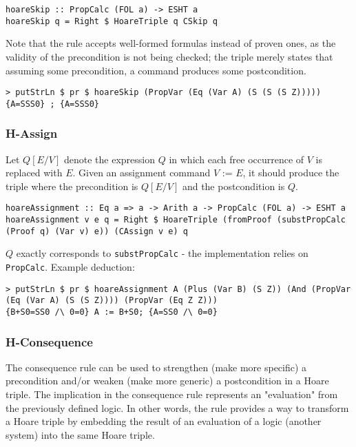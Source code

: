\documentclass{article}
\begin{document}
\begin{lstlisting}
hoareSkip :: PropCalc (FOL a) -> ESHT a
hoareSkip q = Right $ HoareTriple q CSkip q
\end{lstlisting}

Note that the rule accepts well-formed formulas instead of proven ones, as the validity of the precondition is not being checked; the triple merely states that assuming some precondition, a command produces some postcondition.

\begin{lstlisting}
> putStrLn $ pr $ hoareSkip (PropVar (Eq (Var A) (S (S (S Z)))))
{A=SSS0} ; {A=SSS0}
\end{lstlisting}

\subsubsection{H-Assign}

Let $Q[E/V]$ denote the expression $Q$ in which each free occurrence of $V$ is replaced with $E$. Given an assignment command $V \texttt{ := } E$, it should produce the triple where the precondition is $Q[E/V]$ and the postcondition is $Q$.

\begin{lstlisting}
hoareAssignment :: Eq a => a -> Arith a -> PropCalc (FOL a) -> ESHT a
hoareAssignment v e q = Right $ HoareTriple (fromProof (substPropCalc (Proof q) (Var v) e)) (CAssign v e) q
\end{lstlisting}

$Q$ exactly corresponds to \texttt{substPropCalc} - the implementation relies on \texttt{PropCalc}. Example deduction:

\begin{lstlisting}
> putStrLn $ pr $ hoareAssignment A (Plus (Var B) (S Z)) (And (PropVar (Eq (Var A) (S (S Z)))) (PropVar (Eq Z Z)))
{B+S0=SS0 /\ 0=0} A := B+S0; {A=SS0 /\ 0=0}
\end{lstlisting}

\subsubsection{H-Consequence}

The consequence rule can be used to strengthen (make more specific) a precondition and/or weaken (make more generic) a postcondition in a Hoare triple. The implication in the consequence rule represents an "evaluation" from the previously defined logic. In other words, the rule provides a way to transform a Hoare triple by embedding the result of an evaluation of a logic (another system) into the same Hoare triple.
\end{document}
